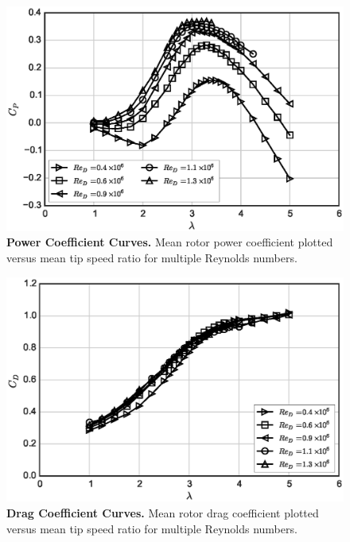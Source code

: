 \documentclass[10pt,letterpaper]{article}
\begin{document}
\begin{figure}[h]
    \includegraphics[width=\textwidth]{figures/cp_curves.eps}

    \caption{{\bf Power Coefficient Curves.} Mean rotor power coefficient
    plotted versus mean tip speed ratio for multiple Reynolds numbers.}

    \label{fig:cp-curves}
\end{figure}

\begin{figure}[h]
    \includegraphics[width=\textwidth]{figures/cd_curves.eps}

    \caption{{\bf Drag Coefficient Curves.} Mean rotor drag coefficient plotted
    versus mean tip speed ratio for multiple Reynolds numbers.}

    \label{fig:cd-curves}
\end{figure}
\end{document}
